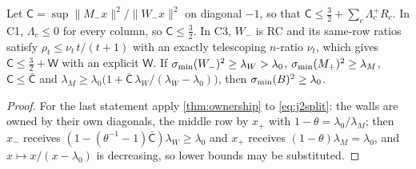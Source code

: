 \begin{lemma}\label{lem:twostage}
Let $\mathsf C=\sup\|M_-x\|^2/\|W_-x\|^2$ on diagonal $-1$, so that
$\mathsf C\le\frac32+\sum_c\Lambda^+_cR_c$. In C1, $\Lambda_c\le0$ for every column, so
$\mathsf C\le\frac32$. In C3, $W_-$ is RC and its same-row ratios satisfy
$\rho_t\le\nu_t\,t/(t+1)$ with an exactly telescoping $n$-ratio $\nu_t$, which gives
$\mathsf C\le\frac32+\mathsf W$ with an explicit $\mathsf W$. If $\sigma_{\min}(W_-)^2\ge \lambda_W>\lambda_0$,
$\sigma_{\min}(M_+)^2\ge \lambda_M$, $\mathsf C\le\bar{\mathsf C}$ and
$\lambda_M\ge\lambda_0\bigl(1+\bar{\mathsf C}\,\lambda_W/(\lambda_W-\lambda_0)\bigr)$, then $\sigma_{\min}(B)^2\ge\lambda_0$.
\end{lemma}

\begin{proof}
For the last statement apply \cref{thm:ownership} to \eqref{eq:j2split}: the walls are owned by
their own diagonals, the middle row by $x_+$ with $1-\theta=\lambda_0/\lambda_M$; then $x_-$ receives
$(1-(\theta^{-1}-1)\bar{\mathsf C})\lambda_W\ge\lambda_0$ and $x_+$ receives $(1-\theta)\lambda_M=\lambda_0$, and
$x\mapsto x/(x-\lambda_0)$ is decreasing, so lower bounds may be substituted.
\end{proof}

